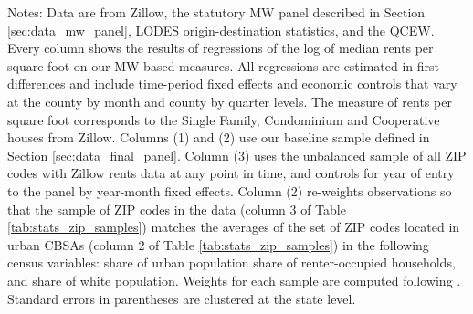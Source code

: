 \begin{table}[hbt!]
    \begin{minipage}{.95\linewidth} \footnotesize
        \vspace{2mm}
        Notes:
        Data are from Zillow,
        the statutory MW panel described in Section \ref{sec:data_mw_panel},
        LODES origin-destination statistics, and the QCEW.
        Every column shows the results of regressions of the log of
        median rents per square foot on our MW-based measures.
        All regressions are estimated in first differences and include 
        time-period fixed effects and economic controls that vary at the 
        county by month and county by quarter levels.
        The measure of rents per square foot corresponds to the Single Family, 
        Condominium and Cooperative houses from Zillow.
        Columns (1) and (2) use our baseline sample defined in Section 
        \ref{sec:data_final_panel}.
        Column (3) uses the unbalanced sample of all ZIP codes with 
        Zillow rents data at any point in time, and controls for year of 
        entry to the panel by year-month fixed effects.
        Column (2) re-weights observations so that the sample of 
        ZIP codes in the data (column 3 of Table \ref{tab:stats_zip_samples}) 
        matches the averages of the set of ZIP codes located in urban CBSAs 
        (column 2 of Table \ref{tab:stats_zip_samples})
        in the following census variables:
        share of urban population
        share of renter-occupied households, and
        share of white population.
        Weights for each sample are computed following \textcite{Hainmueller2012}.
        Standard errors in parentheses are clustered at the state level.
    \end{minipage}
\end{table}
